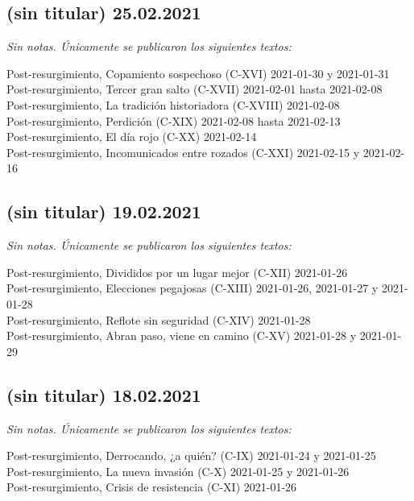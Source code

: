 \documentclass[
  spanish,
]{book}
\begin{document}
\hypertarget{sin-titular-25.02.2021}{%
\subsection*{(sin titular) 25.02.2021}\label{sin-titular-25.02.2021}}

\emph{Sin notas. Únicamente se publicaron los siguientes textos:}

Post-resurgimiento, Copamiento sospechoso (C-XVI) 2021-01-30 y 2021-01-31~\\
Post-resurgimiento, Tercer gran salto (C-XVII) 2021-02-01 hasta 2021-02-08~\\
Post-resurgimiento, La tradición historiadora (C-XVIII) 2021-02-08~\\
Post-resurgimiento, Perdición (C-XIX) 2021-02-08 hasta 2021-02-13~\\
Post-resurgimiento, El día rojo (C-XX) 2021-02-14~\\
Post-resurgimiento, Incomunicados entre rozados (C-XXI) 2021-02-15 y 2021-02-16

\hypertarget{sin-titular-19.02.2021}{%
\subsection*{(sin titular) 19.02.2021}\label{sin-titular-19.02.2021}}

\emph{Sin notas. Únicamente se publicaron los siguientes textos:}

Post-resurgimiento, Divididos por un lugar mejor (C-XII) 2021-01-26~\\
Post-resurgimiento, Elecciones pegajosas (C-XIII) 2021-01-26, 2021-01-27 y 2021-01-28~\\
Post-resurgimiento, Reflote sin seguridad (C-XIV) 2021-01-28~\\
Post-resurgimiento, Abran paso, viene en camino (C-XV) 2021-01-28 y 2021-01-29

\hypertarget{sin-titular-18.02.2021}{%
\subsection*{(sin titular) 18.02.2021}\label{sin-titular-18.02.2021}}

\emph{Sin notas. Únicamente se publicaron los siguientes textos:}

Post-resurgimiento, Derrocando, ¿a quién? (C-IX) 2021-01-24 y 2021-01-25~\\
Post-resurgimiento, La nueva invasión (C-X) 2021-01-25 y 2021-01-26~\\
Post-resurgimiento, Crisis de resistencia (C-XI) 2021-01-26
\end{document}
